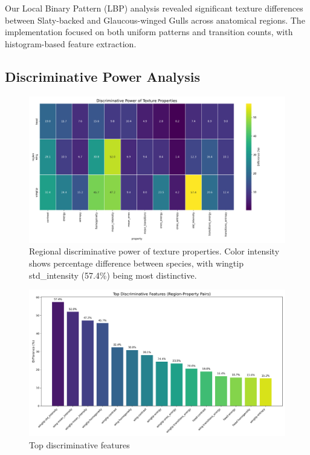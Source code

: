 \documentclass[a4paper,12pt]{report}
\begin{document}
Our Local Binary Pattern (LBP) analysis revealed significant texture differences between Slaty-backed and Glaucous-winged Gulls across anatomical regions. The implementation focused on both uniform patterns and transition counts, with histogram-based feature extraction.

\subsection{Discriminative Power Analysis}
\begin{figure}[htbp]
    \centering
    \includegraphics[width=\textwidth]{images/LBP/discriminative_power_heatmap.png}
    \caption{Regional discriminative power of texture properties. Color intensity shows percentage difference between species, with wingtip std\_intensity (57.4\%) being most distinctive.}
    \label{fig:heatmap}
\end{figure}

\begin{figure}[htbp]
    \centering
    \includegraphics[width=\textwidth]{images/LBP/top_discriminative_features.png}
    \caption{Top discriminative features}
    \label{fig:top_features}
\end{figure}
\end{document}
